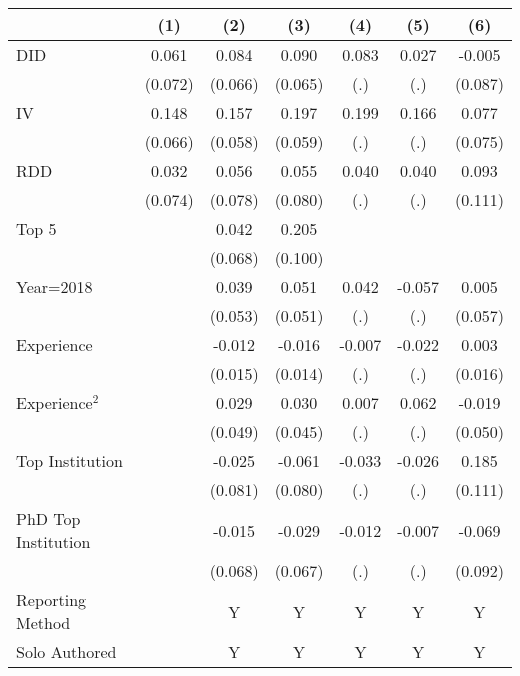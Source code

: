 \begin{tabular}{l*{6}{c}}
\hline\hline
                &\multicolumn{1}{c}{(1)}&\multicolumn{1}{c}{(2)}&\multicolumn{1}{c}{(3)}&\multicolumn{1}{c}{(4)}&\multicolumn{1}{c}{(5)}&\multicolumn{1}{c}{(6)}\\
\hline
DID             &    0.061&    0.084&    0.090&    0.083&    0.027&   -0.005\\
                &  (0.072)&  (0.066)&  (0.065)&      (.)&      (.)&  (0.087)\\
IV              &    0.148&    0.157&    0.197&    0.199&    0.166&    0.077\\
                &  (0.066)&  (0.058)&  (0.059)&      (.)&      (.)&  (0.075)\\
RDD             &    0.032&    0.056&    0.055&    0.040&    0.040&    0.093\\
                &  (0.074)&  (0.078)&  (0.080)&      (.)&      (.)&  (0.111)\\
Top 5           &         &    0.042&    0.205&         &         &         \\
                &         &  (0.068)&  (0.100)&         &         &         \\
Year=2018       &         &    0.039&    0.051&    0.042&   -0.057&    0.005\\
                &         &  (0.053)&  (0.051)&      (.)&      (.)&  (0.057)\\
Experience      &         &   -0.012&   -0.016&   -0.007&   -0.022&    0.003\\
                &         &  (0.015)&  (0.014)&      (.)&      (.)&  (0.016)\\
Experience$^2$  &         &    0.029&    0.030&    0.007&    0.062&   -0.019\\
                &         &  (0.049)&  (0.045)&      (.)&      (.)&  (0.050)\\
Top Institution &         &   -0.025&   -0.061&   -0.033&   -0.026&    0.185\\
                &         &  (0.081)&  (0.080)&      (.)&      (.)&  (0.111)\\
PhD Top Institution&         &   -0.015&   -0.029&   -0.012&   -0.007&   -0.069\\
                &         &  (0.068)&  (0.067)&      (.)&      (.)&  (0.092)\\
Reporting Method &         &        Y&        Y&        Y&        Y&        Y\\
Solo Authored   &         &        Y&        Y&        Y&        Y&        Y\\

\end{tabular}
